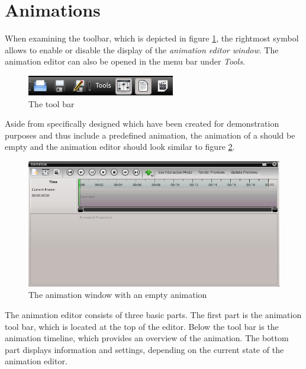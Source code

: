 

\section*{Animations}
\label{section:animation_editor}

When examining the \Voreen toolbar, which is depicted in figure \ref{fig:tool_bar}, the rightmost symbol allows to enable or disable the display of the \emph{animation editor window}. The animation editor can also be opened in the menu bar under \textit{Tools}.

\begin{figure}[htb]
 \centering
 \includegraphics[scale=1.1,keepaspectratio=true]{./images/tool_bar.png}
 \caption{The \Voreen tool bar}
 \label{fig:tool_bar}
\end{figure}

Aside from specifically designed \Voreen \workspaces which have been created for demonstration purposes and thus include a predefined animation, the animation of a \workspace should be empty and the animation 
editor should look similar to figure \ref{fig:animation_window}.

\begin{figure}[htb]
 \centering
 \includegraphics[scale=0.5,keepaspectratio=true]{./images/animation_window.png}
 \caption{The animation window with an empty animation}
 \label{fig:animation_window}
\end{figure}

The animation editor consists of three basic parts. The first part is the animation tool bar, which is located at the top of the editor. Below the tool bar is the 
animation timeline, which provides an overview of the animation. The bottom part displays information and settings, depending on the current state of the animation
editor. 

